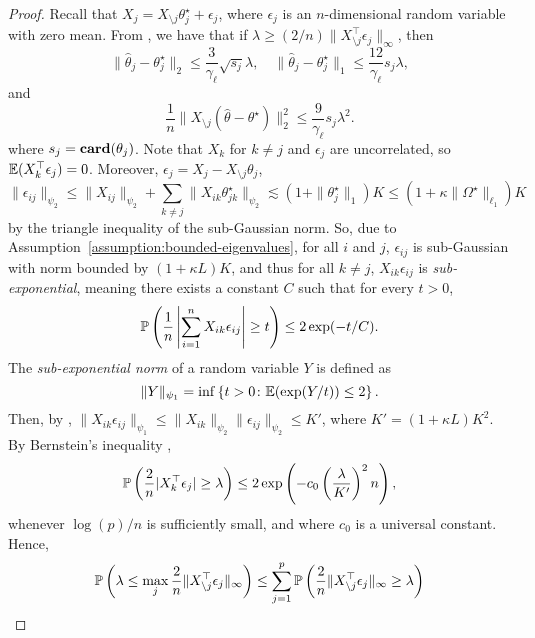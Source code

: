 \documentclass{article}
\begin{document}
\begin{proof}
Recall that $X_j = X_{\setminus j} \theta_j^\star + \epsilon_j$, where
$\epsilon_j$ is an $n$-dimensional random variable with zero mean. From
\cite{Bickel09}, we have that if $\lambda \geq (2/n) \|X_{\setminus j}^\top
\epsilon_j\|_\infty$, then 
\begin{equation}\label{eq:lasso-error-1}
    \|\hat \theta_j - \theta_j^\star\|_2 \leq \frac{3}{\gamma_\ell} \sqrt{s_j} \lambda, \quad \|\hat \theta_j - \theta_j^\star\|_1 \leq \frac{12}{\gamma_\ell}  s_j \lambda,
\end{equation}
and 
\begin{equation}\label{eq:lasso-error-2}
    \frac{1}{n}\|X_{\setminus j}(\hat \theta - \theta^\star)\|_2^2 \leq \frac{9}{\gamma_\ell} s_j \lambda^2.
\end{equation}
where $s_j = \mathop{\bf card}(\theta_j)$. Note that $X_k$ for $k \neq j$ and $\epsilon_j$
are uncorrelated, so ${\mathbb{E}}(X_k^\top \epsilon_j) = 0$. Moreover, $\epsilon_j = X_j
- X_{\setminus j} \theta_j$,
\[
    \|\epsilon_{ij}\|_{\psi_2} \leq \|X_{ij}\|_{\psi_2} + \sum_{k\neq j} \|X_{ik} \theta_{jk}^\star\|_{\psi_2} \lesssim (1 + \|\theta_j^\star\|_1) K \leq (1 + \kappa \|\Omega^\star\|_{\ell_1}) K
\]
by the triangle inequality of the sub-Gaussian norm. So, due to
Assumption~\ref{assumption:bounded-eigenvalues}, for all $i$ and $j$,
$\epsilon_{ij}$ is sub-Gaussian with norm bounded by $(1 + \kappa L) K$, and
thus for all $k\neq j$, $X_{ik} \epsilon_{ij}$ is \emph{sub-exponential},
meaning there exists a constant $C$ such that for every $t>0$,
\[
    {\mathbb{P}}\left(\frac{1}{n}\left|\sum_{i=1}^{n} X_{ik} \epsilon_{ij}\right| \geq t\right) \leq 2 \exp(-t/C).
\]
The \emph{sub-exponential norm} of a random variable $Y$ is defined as
\[
    \|Y\|_{\psi_1} = \inf\left\{t > 0 \colon {\mathbb{E}}(\exp(Y/t)) \leq 2\right\}.
\]
Then, by \citep[Lemma~2.7.7]{Vershynin18}, $\|X_{ik} \epsilon_{ij}\|_{\psi_1}
\leq \|X_{ik}\|_{\psi_2} \|\epsilon_{ij}\|_{\psi_2} \leq K'$, where $K' = (1 +
\kappa L) K^2$. By Bernstein's inequality \citep[Corollary~2.8.3]{Vershynin18},
\[
    {\mathbb{P}}\left(\frac{2}{n}|X_k^\top \epsilon_j| \geq \lambda \right) \leq 2 \exp\left(-c_0\left(\frac{\lambda}{K'}\right)^2 n \right),
\]
whenever $\log (p) /n$ is sufficiently small, and where $c_0$ is a universal
constant. Hence,
\[
    \begin{aligned}
        \prob\left(\lambda \leq \max_j \frac{2}{n}\|X_{\setminus j}^\top \epsilon_j\|_\infty\right) &\leq \sum_{j=1}^{p} \prob\left(\frac{2}{n}\|X_{\setminus j}^\top \epsilon_j\|_\infty \geq \lambda\right) \\

\end{aligned}\]
\end{proof}
\end{document}
